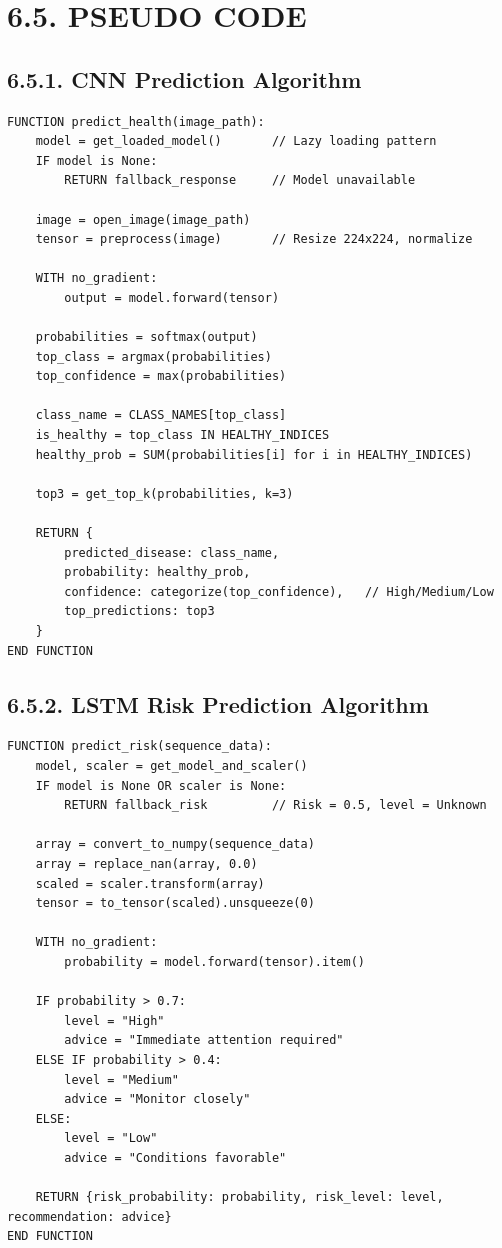 \documentclass[12pt, a4paper]{report}
\begin{document}
\section{6.5. PSEUDO CODE}
\subsection{6.5.1. CNN Prediction Algorithm}
\begin{Verbatim}[fontsize=\small]
FUNCTION predict_health(image_path):
    model = get_loaded_model()       // Lazy loading pattern
    IF model is None:
        RETURN fallback_response     // Model unavailable

    image = open_image(image_path)
    tensor = preprocess(image)       // Resize 224x224, normalize

    WITH no_gradient:
        output = model.forward(tensor)

    probabilities = softmax(output)
    top_class = argmax(probabilities)
    top_confidence = max(probabilities)

    class_name = CLASS_NAMES[top_class]
    is_healthy = top_class IN HEALTHY_INDICES
    healthy_prob = SUM(probabilities[i] for i in HEALTHY_INDICES)

    top3 = get_top_k(probabilities, k=3)

    RETURN {
        predicted_disease: class_name,
        probability: healthy_prob,
        confidence: categorize(top_confidence),   // High/Medium/Low
        top_predictions: top3
    }
END FUNCTION
\end{Verbatim}
\subsection{6.5.2. LSTM Risk Prediction Algorithm}
\begin{Verbatim}[fontsize=\small]
FUNCTION predict_risk(sequence_data):
    model, scaler = get_model_and_scaler()
    IF model is None OR scaler is None:
        RETURN fallback_risk         // Risk = 0.5, level = Unknown

    array = convert_to_numpy(sequence_data)
    array = replace_nan(array, 0.0)
    scaled = scaler.transform(array)
    tensor = to_tensor(scaled).unsqueeze(0)

    WITH no_gradient:
        probability = model.forward(tensor).item()

    IF probability > 0.7:
        level = "High"
        advice = "Immediate attention required"
    ELSE IF probability > 0.4:
        level = "Medium"
        advice = "Monitor closely"
    ELSE:
        level = "Low"
        advice = "Conditions favorable"

    RETURN {risk_probability: probability, risk_level: level, recommendation: advice}
END FUNCTION
\end{Verbatim}
\end{document}
